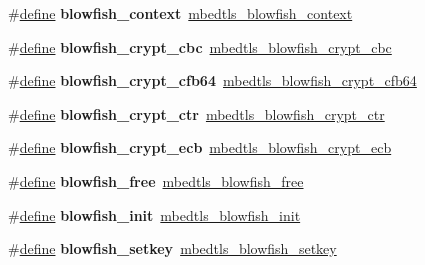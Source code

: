 \begin{DoxyCompactItemize}
\#\hyperlink{structdefine}{define} {\bfseries blowfish\+\_\+context}~\hyperlink{structmbedtls__blowfish__context}{mbedtls\+\_\+blowfish\+\_\+context}
\item 
\mbox{\label{compat-1_83_8h_ad62fff7f7449485c06953a8b48491723}} 
\#\hyperlink{structdefine}{define} {\bfseries blowfish\+\_\+crypt\+\_\+cbc}~\hyperlink{blowfish_8h_a24f95511214b38914090036938cbc045}{mbedtls\+\_\+blowfish\+\_\+crypt\+\_\+cbc}
\item 
\mbox{\label{compat-1_83_8h_a6efa54a6c021a34a07f539aa2ac3255f}} 
\#\hyperlink{structdefine}{define} {\bfseries blowfish\+\_\+crypt\+\_\+cfb64}~\hyperlink{blowfish_8h_af3996e5bb50864497b0c7349819ffd12}{mbedtls\+\_\+blowfish\+\_\+crypt\+\_\+cfb64}
\item 
\mbox{\label{compat-1_83_8h_aa1bab5e4d7e9af085f0c24f4986246b1}} 
\#\hyperlink{structdefine}{define} {\bfseries blowfish\+\_\+crypt\+\_\+ctr}~\hyperlink{blowfish_8h_a7d1688bf5fb906fdbad101e08bc8bf85}{mbedtls\+\_\+blowfish\+\_\+crypt\+\_\+ctr}
\item 
\mbox{\label{compat-1_83_8h_a3aed8a20e4f762f24a1319de775fe934}} 
\#\hyperlink{structdefine}{define} {\bfseries blowfish\+\_\+crypt\+\_\+ecb}~\hyperlink{blowfish_8h_afe15cef6820aa39a999e7268bf6f4c29}{mbedtls\+\_\+blowfish\+\_\+crypt\+\_\+ecb}
\item 
\mbox{\label{compat-1_83_8h_a95cd8a27267071b271db4101687b5ceb}} 
\#\hyperlink{structdefine}{define} {\bfseries blowfish\+\_\+free}~\hyperlink{blowfish_8h_ac249a721d4a718295311305471d9d80b}{mbedtls\+\_\+blowfish\+\_\+free}
\item 
\mbox{\label{compat-1_83_8h_a1a0efd8113c646c339a0721c6f16d029}} 
\#\hyperlink{structdefine}{define} {\bfseries blowfish\+\_\+init}~\hyperlink{blowfish_8h_ab3f9ff267483076e9c834df5b362ecff}{mbedtls\+\_\+blowfish\+\_\+init}
\item 
\mbox{\label{compat-1_83_8h_acc0d47cd16208bcc569a6b409fc53686}} 
\#\hyperlink{structdefine}{define} {\bfseries blowfish\+\_\+setkey}~\hyperlink{blowfish_8h_a272e6906daa7083c8020f3311da7fb12}{mbedtls\+\_\+blowfish\+\_\+setkey}
\item 

\end{DoxyCompactItemize}
